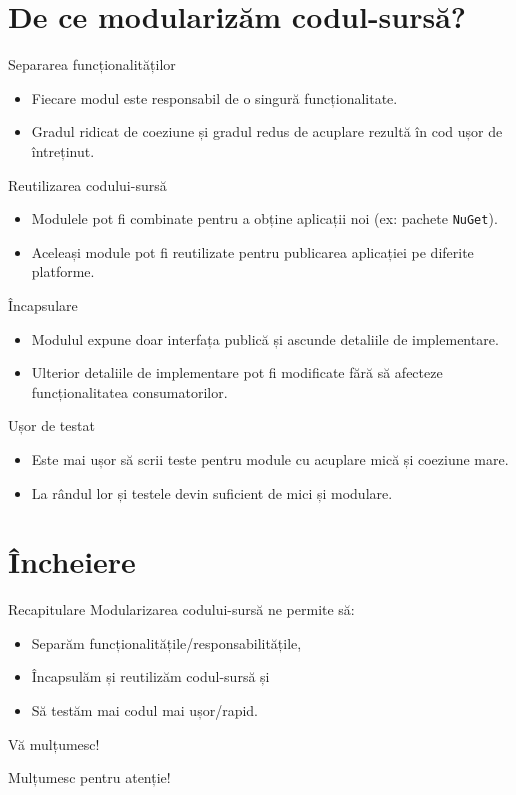 \documentclass[presentation]{beamer}
\begin{document}
\section{De ce modularizăm codul-sursă?}
\label{sec:orgd5e70ad}
\begin{frame}[label={sec:org75ebbc4}]{Separarea funcționalităților}
\begin{itemize}
\item Fiecare modul este responsabil de o singură funcționalitate.
\item Gradul ridicat de coeziune și gradul redus de acuplare rezultă în cod ușor de întreținut.
\end{itemize}
\end{frame}
\begin{frame}[label={sec:orgd08bcc9},fragile]{Reutilizarea codului-sursă}
 \begin{itemize}
\item Modulele pot fi combinate pentru a obține aplicații noi (ex: pachete \texttt{NuGet}).
\item Aceleași module pot fi reutilizate pentru publicarea aplicației pe diferite platforme.
\end{itemize}
\end{frame}
\begin{frame}[label={sec:org11c0295}]{Încapsulare}
\begin{itemize}
\item Modulul expune doar interfața publică și ascunde detaliile de implementare.
\item Ulterior detaliile de implementare pot fi modificate fără să afecteze funcționalitatea consumatorilor.
\end{itemize}
\end{frame}
\begin{frame}[label={sec:org8ff58c1}]{Ușor de testat}
\begin{itemize}
\item Este mai ușor să scrii teste pentru module cu acuplare mică și coeziune mare.
\item La rândul lor și testele devin suficient de mici și modulare.
\end{itemize}
\end{frame}
\section{Încheiere}
\label{sec:orge06ba92}
\begin{frame}[label={sec:orgfcbf27d}]{Recapitulare}
Modularizarea codului-sursă ne permite să:
\begin{itemize}
\item Separăm funcționalitățile/responsabilitățile,
\item Încapsulăm și reutilizăm codul-sursă și
\item Să testăm mai codul mai ușor/rapid.
\end{itemize}
\end{frame}
\begin{frame}[label={sec:org4211c7f}]{Vă mulțumesc!}
\begin{center}
Mulțumesc pentru atenție!
\end{center}
\end{frame}
\end{document}
